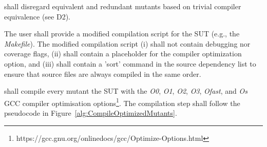 \RQ{} \FAQAS shall disregard equivalent and redundant mutants based on trivial compiler equivalence (see D2).

\RQ{} The user shall provide a modified compilation script for the SUT (e.g., the \emph{Makefile}). The modified compilation script (i) shall not contain debugging nor coverage flags, (ii) shall contain a placeholder for the compiler optimization option, and (iii) shall contain a 'sort' command in the source dependency list to ensure that source files are always compiled in the same order.


\RQ{} \FAQAS shall compile every mutant the SUT with the \textit{O0}, \textit{O1}, \textit{O2}, \textit{O3}, \textit{Ofast}, and \textit{Os} GCC compiler optimisation options\footnote{https://gcc.gnu.org/onlinedocs/gcc/Optimize-Options.html}.
The compilation step shall follow the pseudocode in Figure~\ref{alg:CompileOptimizedMutants}.


